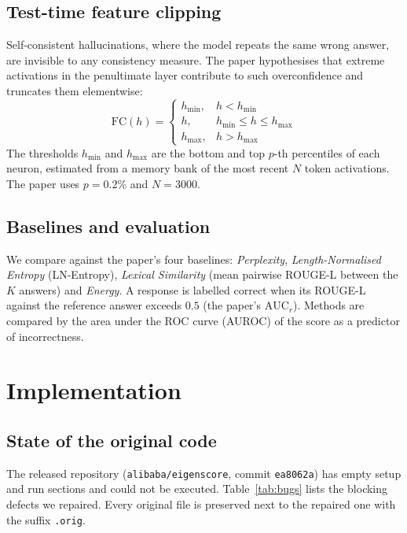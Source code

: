 \documentclass[conference]{IEEEtran}
\begin{document}
\subsection{Test-time feature clipping}
Self-consistent hallucinations, where the model repeats the same wrong answer, are invisible to any consistency measure. The paper hypothesises that extreme activations in the penultimate layer contribute to such overconfidence and truncates them elementwise:
\begin{equation}
\mathrm{FC}(h)=\begin{cases}
h_{\min}, & h<h_{\min}\\
h, & h_{\min}\le h\le h_{\max}\\
h_{\max}, & h>h_{\max}
\end{cases}
\end{equation}
The thresholds $h_{\min}$ and $h_{\max}$ are the bottom and top $p$-th percentiles of each neuron, estimated from a memory bank of the most recent $N$ token activations. The paper uses $p=0.2\%$ and $N=3000$.

\subsection{Baselines and evaluation}
We compare against the paper's four baselines: \emph{Perplexity}, \emph{Length-Normalised Entropy} (LN-Entropy), \emph{Lexical Similarity} (mean pairwise ROUGE-L between the $K$ answers) and \emph{Energy}. A response is labelled correct when its ROUGE-L against the reference answer exceeds $0.5$ (the paper's $\mathrm{AUC}_r$). Methods are compared by the area under the ROC curve (AUROC) of the score as a predictor of incorrectness.

\section{Implementation}
\subsection{State of the original code}
The released repository (\texttt{alibaba/eigenscore}, commit \texttt{ea8062a}) has empty setup and run sections and could not be executed. Table~\ref{tab:bugs} lists the blocking defects we repaired. Every original file is preserved next to the repaired one with the suffix \texttt{.orig}.
\end{document}
